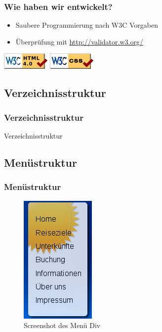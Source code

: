 \documentclass[xcolor=dvipsnames]{beamer}
\begin{document}
\begin{frame} %
  \frametitle{Wie haben wir entwickelt?} %
  \begin{block}{}
	  \begin{itemize}
		\item Saubere Programmierung nach W3C Vorgaben
		\item Überprüfung mit \url{http://validator.w3.org/}
	  \end{itemize}
  \end{block}
  \center
  \includegraphics[scale=0.5]{valid-html40.png}
  \includegraphics[scale=0.5]{vcss.png}

\end{frame}


\subsection{Verzeichnisstruktur}
\begin{frame} %
  \frametitle{Verzeichnisstruktur} %
  \begin{block}{Verzeichnisstruktur}
  \end{block}
\end{frame}

\subsection{Menüstruktur}
\begin{frame} %
  \frametitle{Menüstruktur} %
	\begin{figure}
	\includegraphics[scale=0.8]{screenshot_menue.png}
	\caption{Screenshot des Menü Div}
	\end{figure}
\end{frame}
\end{document}
